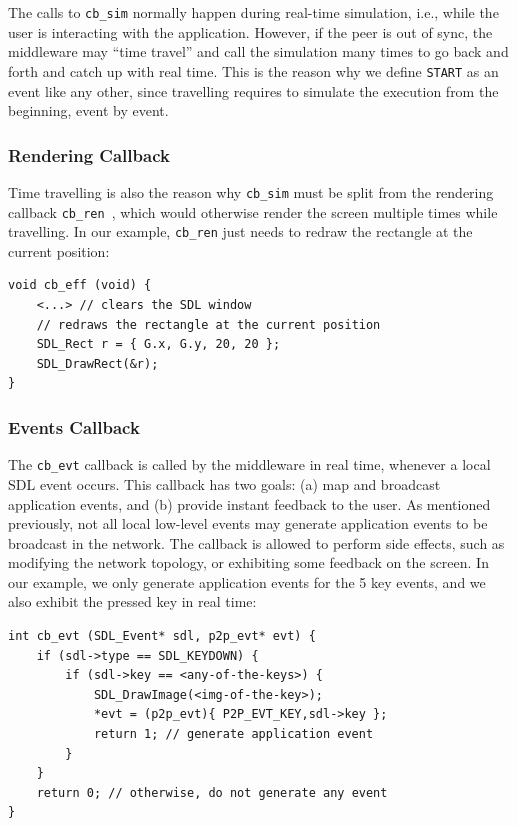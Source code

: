 \documentclass[10pt,journal,compsoc]{IEEEtran}
\newcommand{\code}[1]  {\texttt{\footnotesize{#1}}}
\begin{document}
The calls to \code{cb\_sim} normally happen during real-time simulation, i.e.,
while the user is interacting with the application.
However, if the peer is out of sync, the middleware may ``time travel'' and
call the simulation many times to go back and forth and catch up with real
time.
This is the reason why we define \code{START} as an event like any other, since
travelling requires to simulate the execution from the beginning, event by
event.

\subsubsection{Rendering Callback}

Time travelling is also the reason why \code{cb\_sim} must be split from the
rendering callback \code{cb\_ren}~\cite{tml.js}, which would otherwise render
the screen multiple times while travelling.
In our example, \code{cb\_ren} just needs to redraw the rectangle at the
current position:

{\footnotesize
\begin{verbatim}
void cb_eff (void) {
    <...> // clears the SDL window
    // redraws the rectangle at the current position
    SDL_Rect r = { G.x, G.y, 20, 20 };
    SDL_DrawRect(&r);
}
\end{verbatim}
}

\subsubsection{Events Callback}

The \code{cb\_evt} callback is called by the middleware in real time, whenever
a local SDL event occurs.
This callback has two goals:
    (a) map and broadcast application events, and
    (b) provide instant feedback to the user.
As mentioned previously, not all local low-level events may generate
application events to be broadcast in the network.
The callback is allowed to perform side effects, such as modifying the network
topology, or exhibiting some feedback on the screen.
In our example, we only generate application events for the 5 key events, and
we also exhibit the pressed key in real time:

{\footnotesize
\begin{verbatim}
int cb_evt (SDL_Event* sdl, p2p_evt* evt) {
    if (sdl->type == SDL_KEYDOWN) {
        if (sdl->key == <any-of-the-keys>) {
            SDL_DrawImage(<img-of-the-key>);
            *evt = (p2p_evt){ P2P_EVT_KEY,sdl->key };
            return 1; // generate application event
        }
    }
    return 0; // otherwise, do not generate any event
}
\end{verbatim}
}
\end{document}
